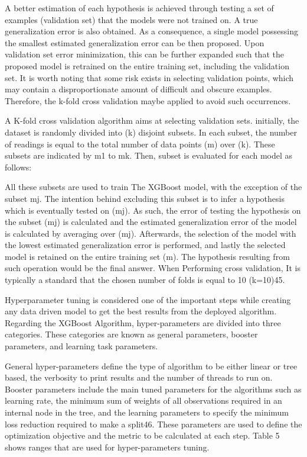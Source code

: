 A better estimation of each hypothesis is achieved through testing a set of examples (validation set) that the models were not trained on. A true generalization error is also obtained. As a consequence, a single model possessing the smallest estimated generalization error can be then proposed. Upon validation set error minimization, this can be further expanded such that the proposed model is retrained on the entire training set, including the validation set. It is worth noting that some risk exists in selecting validation points, which may contain a disproportionate amount of difficult and obscure examples. Therefore, the k-fold cross validation maybe applied to avoid such occurrences. 

A K-fold cross validation algorithm aims at selecting validation sets. initially, the dataset is randomly divided into (k) disjoint subsets. In each subset, the number of readings is equal to the total number of data points (m) over (k). These subsets are indicated by m1 to mk. Then, subset is evaluated for each model as follows:

All these subsets are used to train The XGBoost model, with the exception of the subset mj. The intention behind excluding this subset is to infer a hypothesis which is eventually tested on (mj). As such, the error of testing the hypothesis on the subset (mj) is calculated and the estimated generalization error of the model is calculated by averaging over (mj). Afterwards, the selection of the model with the lowest estimated generalization error is performed, and lastly the selected model is retained on the entire training set (m). The hypothesis resulting from such operation would be the final answer. When Performing cross validation, It is typically a standard that the chosen number of folds is equal to 10 (k=10)45.

Hyperparameter tuning is considered one of the important steps while creating any data driven model to get the best results from the deployed algorithm. Regarding the XGBoost Algorithm, hyper-parameters are divided into three categories. These categories are known as general parameters, booster parameters, and learning task parameters. 

General hyper-parameters define the type of algorithm to be either linear or tree based, the verbosity to print results and the number of threads to run on. Booster parameters include the main tuned parameters for the algorithms such as learning rate, the minimum sum of weights of all observations required in an internal node in the tree, and the learning parameters to specify the minimum loss reduction required to make a split46. These parameters are used to define the optimization objective and the metric to be calculated at each step. Table 5 shows ranges that are used for hyper-parameters tuning.

